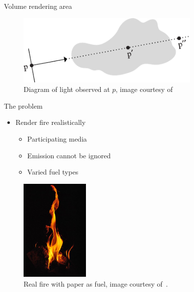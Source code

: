 \documentclass{beamer}
\begin{document}
\begin{frame}{Volume rendering area}

\begin{figure}[b!]
\includegraphics[width=0.8\textwidth]{img/ray_marching}
\caption*{\tiny{Diagram of light observed at $p$, image courtesy of~\cite{Pharr:2004}}}
\end{figure}

\end{frame}

\begin{frame}{The problem}

\begin{multicols}{2}

\begin{itemize}
\setlength\itemsep{0.5em}
\item Render fire realistically 
		\begin{itemize}
		\setlength\itemsep{0.5em}
		\item Participating media 
		\item Emission cannot be ignored
		\item Varied fuel types
		\end{itemize}
\end{itemize}

\begin{figure}[t!]
\begin{center}
\includegraphics[width=0.3\textwidth]{img/real_fire1} 
\caption*{\tiny{Real fire with paper as fuel, image courtesy of~\cite{real_fire1}.}}
\end{center}
\end{figure}
\end{multicols}

\end{frame}
\end{document}

